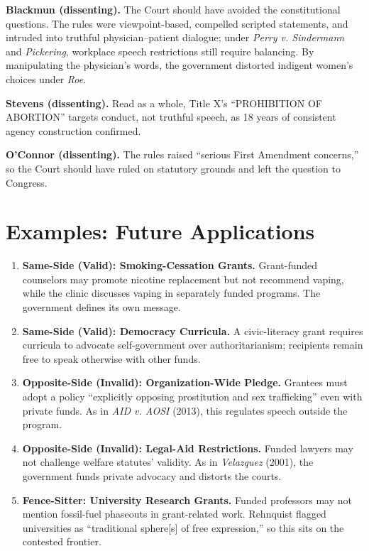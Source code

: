\documentclass[12pt]{article}
\begin{document}
\textbf{Blackmun (dissenting).} The Court should have avoided the constitutional questions. The rules were viewpoint-based, compelled scripted statements, and intruded into truthful physician--patient dialogue; under \textit{Perry v. Sindermann} and \textit{Pickering}, workplace speech restrictions still require balancing. By manipulating the physician's words, the government distorted indigent women's choices under \textit{Roe}.

\textbf{Stevens (dissenting).} Read as a whole, Title X's ``PROHIBITION OF ABORTION'' targets conduct, not truthful speech, as 18 years of consistent agency construction confirmed.

\textbf{O'Connor (dissenting).} The rules raised ``serious First Amendment concerns,'' so the Court should have ruled on statutory grounds and left the question to Congress.

\section{Examples: Future Applications}

\begin{enumerate}
\item \textbf{Same-Side (Valid): Smoking-Cessation Grants.} Grant-funded counselors may promote nicotine replacement but not recommend vaping, while the clinic discusses vaping in separately funded programs. The government defines its own message.
\item \textbf{Same-Side (Valid): Democracy Curricula.} A civic-literacy grant requires curricula to advocate self-government over authoritarianism; recipients remain free to speak otherwise with other funds.
\item \textbf{Opposite-Side (Invalid): Organization-Wide Pledge.} Grantees must adopt a policy ``explicitly opposing prostitution and sex trafficking'' even with private funds. As in \textit{AID v. AOSI} (2013), this regulates speech outside the program.
\item \textbf{Opposite-Side (Invalid): Legal-Aid Restrictions.} Funded lawyers may not challenge welfare statutes' validity. As in \textit{Velazquez} (2001), the government funds private advocacy and distorts the courts.
\item \textbf{Fence-Sitter: University Research Grants.} Funded professors may not mention fossil-fuel phaseouts in grant-related work. Rehnquist flagged universities as ``traditional sphere[s] of free expression,'' so this sits on the contested frontier.
\end{enumerate}
\end{document}
